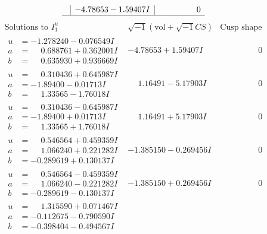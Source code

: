 \documentclass[1p]{elsarticle_modified}
\theoremstyle{definition}
\newcommand{\I}{\sqrt{-1}}
\begin{document}
$$\begin{array}{c|c|c}
 & -4.78653 - 1.59407 I & \phantom{-0.000000 } 0\\
 \hline 
 \end{array}$$\newpage$$\begin{array}{c|c|c}  
\text{Solutions to }I^u_{1}& \I (\text{vol} + \sqrt{-1}CS) & \text{Cusp shape}\\
 \hline 
\begin{aligned}
u &= -1.278240 - 0.076549 I \\
a &= \phantom{-}0.688761 + 0.362001 I \\
b &= \phantom{-}0.635930 + 0.936669 I\end{aligned}
 & -4.78653 + 1.59407 I & \phantom{-0.000000 } 0 \\ \hline\begin{aligned}
u &= \phantom{-}0.310436 + 0.645987 I \\
a &= -1.89400 - 0.01713 I \\
b &= \phantom{-}1.33565 - 1.76018 I\end{aligned}
 & \phantom{-}1.16491 - 5.17903 I & \phantom{-0.000000 } 0 \\ \hline\begin{aligned}
u &= \phantom{-}0.310436 - 0.645987 I \\
a &= -1.89400 + 0.01713 I \\
b &= \phantom{-}1.33565 + 1.76018 I\end{aligned}
 & \phantom{-}1.16491 + 5.17903 I & \phantom{-0.000000 } 0 \\ \hline\begin{aligned}
u &= \phantom{-}0.546564 + 0.459359 I \\
a &= \phantom{-}1.066240 + 0.221282 I \\
b &= -0.289619 + 0.130137 I\end{aligned}
 & -1.385150 - 0.269456 I & \phantom{-0.000000 } 0 \\ \hline\begin{aligned}
u &= \phantom{-}0.546564 - 0.459359 I \\
a &= \phantom{-}1.066240 - 0.221282 I \\
b &= -0.289619 - 0.130137 I\end{aligned}
 & -1.385150 + 0.269456 I & \phantom{-0.000000 } 0 \\ \hline\begin{aligned}
u &= \phantom{-}1.315590 + 0.071467 I \\
a &= -0.112675 - 0.790590 I \\
b &= -0.398404 - 0.494567 I\end{aligned}

\end{array}$$
\end{document}
